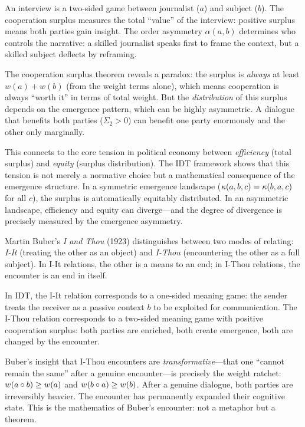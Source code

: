 \begin{example}
An interview is a two-sided game between journalist ($a$) and subject ($b$).
The cooperation surplus measures the total ``value'' of the interview:
positive surplus means both parties gain insight. The order asymmetry
$\alpha(a, b)$ determines who controls the narrative: a skilled journalist
speaks first to frame the context, but a skilled subject deflects by
reframing.
\end{example}

\begin{remark}
The cooperation surplus theorem reveals a paradox: the surplus is
\emph{always} at least $w(a) + w(b)$ (from the weight terms alone),
which means cooperation is always ``worth it'' in terms of total weight.
But the \emph{distribution} of this surplus depends on the emergence
pattern, which can be highly asymmetric. A dialogue that benefits
both parties ($\Sigma_2 > 0$) can benefit one party enormously and
the other only marginally.

This connects to the core tension in political economy between
\emph{efficiency} (total surplus) and \emph{equity} (surplus distribution).
The IDT framework shows that this tension is not merely a normative choice
but a mathematical consequence of the emergence structure. In a symmetric
emergence landscape ($\kappa(a, b, c) = \kappa(b, a, c)$ for all $c$),
the surplus is automatically equitably distributed. In an asymmetric
landscape, efficiency and equity can diverge---and the degree of divergence
is precisely measured by the emergence asymmetry.
\end{remark}

\begin{interpretation}
Martin Buber's \emph{I and Thou} (1923) distinguishes between two
modes of relating: \emph{I-It} (treating the other as an object) and
\emph{I-Thou} (encountering the other as a full subject). In I-It
relations, the other is a means to an end; in I-Thou relations, the
encounter is an end in itself.

In IDT, the I-It relation corresponds to a one-sided meaning game:
the sender treats the receiver as a passive context $b$ to be exploited
for communication. The I-Thou relation corresponds to a two-sided
meaning game with positive cooperation surplus: both parties are
enriched, both create emergence, both are changed by the encounter.

Buber's insight that I-Thou encounters are \emph{transformative}---that
one ``cannot remain the same'' after a genuine encounter---is precisely
the weight ratchet: $w(a \circ b) \geq w(a)$ and $w(b \circ a)
\geq w(b)$. After a genuine dialogue, both parties are irreversibly
heavier. The encounter has permanently expanded their cognitive state.
This is the mathematics of Buber's encounter: not a metaphor but a
theorem.
\end{interpretation}


